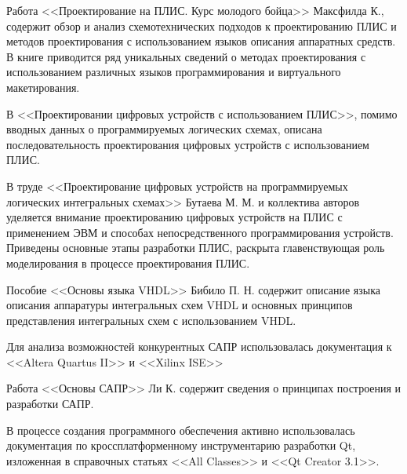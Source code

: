 Работа <<Проектирование на ПЛИС. Курс молодого бойца>> Максфилда К., содержит обзор и анализ схемотехнических подходов к проектированию ПЛИС и методов проектирования с использованием языков описания аппаратных средств.
В книге приводится ряд уникальных сведений о методах проектирования с использованием различных языков программирования и виртуального макетирования.

В <<Проектировании цифровых устройств с использованием ПЛИС>>, помимо вводных данных о программируемых логических схемах, описана последовательность проектирования цифровых устройств с использованием ПЛИС.

В труде <<Проектирование цифровых устройств на программируемых логических интегральных схемах>> Бутаева М. М. и коллектива авторов уделяется внимание проектированию цифровых устройств на ПЛИС с применением ЭВМ и способах непосредственного программирования устройств.
Приведены основные этапы разработки ПЛИС, раскрыта главенствующая роль моделирования в процессе проектирования ПЛИС.

Пособие <<Основы языка VHDL>> Бибило П. Н. содержит описание языка описания аппаратуры интегральных схем VHDL и основных принципов представления интегральных схем с использованием VHDL.

Для анализа возможностей конкурентных САПР использовалась документация к <<Altera Quartus II>> и <<Xilinx ISE>>

Работа <<Основы САПР>> Ли К. содержит сведения о принципах построения и разработки САПР.

В процессе создания программного обеспечения активно использовалась документация по кроссплатформенному инструментарию разработки Qt, изложенная в справочных статьях <<All Classes>> и <<Qt Creator 3.1>>.